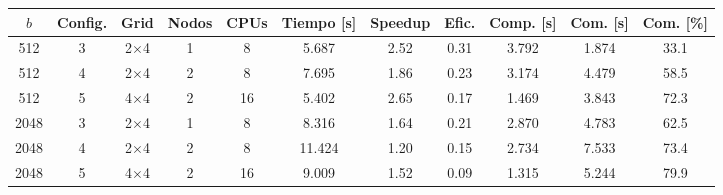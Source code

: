 \begin{tabular}{ccccccccccc}
\toprule
$b$ & Config. & Grid & Nodos & CPUs & Tiempo [s] & Speedup & Efic. & Comp. [s] & Com. [s] & Com. [\%] \\
\midrule
512 & 3 & 2$\times$4 & 1 & 8 & 5.687 & 2.52 & 0.31 & 3.792 & 1.874 & 33.1 \\
512 & 4 & 2$\times$4 & 2 & 8 & 7.695 & 1.86 & 0.23 & 3.174 & 4.479 & 58.5 \\
512 & 5 & 4$\times$4 & 2 & 16 & 5.402 & 2.65 & 0.17 & 1.469 & 3.843 & 72.3 \\
2048 & 3 & 2$\times$4 & 1 & 8 & 8.316 & 1.64 & 0.21 & 2.870 & 4.783 & 62.5 \\
2048 & 4 & 2$\times$4 & 2 & 8 & 11.424 & 1.20 & 0.15 & 2.734 & 7.533 & 73.4 \\
2048 & 5 & 4$\times$4 & 2 & 16 & 9.009 & 1.52 & 0.09 & 1.315 & 5.244 & 79.9 \\
\bottomrule
\end{tabular}

